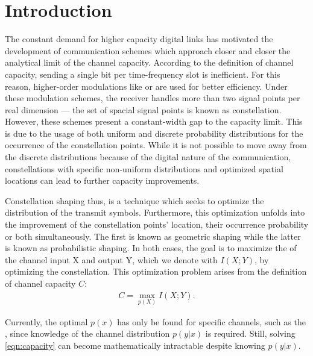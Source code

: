 \chapter{Introduction}\label{chap:introduction}

The constant demand for higher capacity digital links has motivated the development of communication schemes which approach closer and closer the analytical limit of the channel capacity. According to the definition of channel capacity, sending a single bit per time-frequency slot is inefficient. For this reason, higher-order modulations like  or  are used for better efficiency. Under these modulation schemes, the receiver handles more than two signal points per real dimension --- the set of spacial signal points is known as constellation. However, these schemes present a constant-width gap to the capacity limit. This is due to the usage of both uniform and discrete probability distributions for the occurrence of the constellation points. While it is not possible to move away from the discrete distributions because of the digital nature of the communication, constellations with specific non-uniform distributions and optimized spatial locations can lead to further capacity improvements. 

Constellation shaping thus, is a technique which seeks to optimize the distribution of the transmit symbols. Furthermore, this optimization unfolds into the improvement of the constellation points' location, their occurrence probability or both simultaneously. The first is known as geometric shaping while the latter is known as probabilistic shaping. In both cases, the goal is to maximize the  of the channel input X and output Y, which we denote with $I(X;Y)$, by optimizing the constellation. This optimization problem arises from the definition of channel capacity $C$:
\begin{align}
\label{eqn:capacity}
	C = \max_{p(X)} I(X;Y).
\end{align}

Currently, the optimal $p(x)$ has only be found for specific channels, such as the , since knowledge of the channel distribution $p(y|x)$ is required. Still, solving \ref{eqn:capacity} can become mathematically intractable despite knowing $p(y|x)$.

